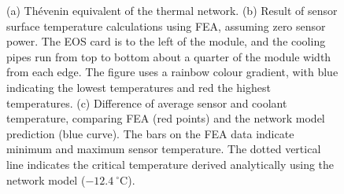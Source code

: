 \begin{figure}[t!]
\centering
{}\quad
{}\quad\quad
{}
\caption{(a) Th\'{e}venin equivalent of the thermal network. (b) Result of sensor surface temperature calculations using FEA, assuming zero sensor power. The EOS card is to the left of the module, and the cooling pipes run from top to bottom about a quarter of the module width from each edge. The figure uses a rainbow colour gradient, with blue indicating the lowest temperatures and red the highest temperatures. (c) Difference of average sensor and coolant temperature, comparing FEA (red points) and the network model prediction (blue curve). The bars on the FEA data indicate minimum and maximum sensor temperature. The dotted vertical line indicates the critical temperature derived analytically using the network model ($-12.4~^\circ$C).}
\label{fig:verification}
\end{figure}
